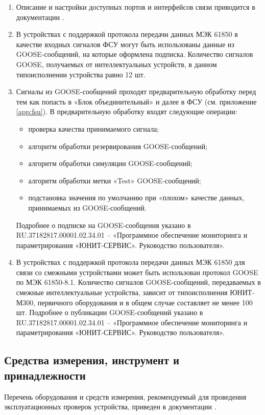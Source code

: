 \begin{enumerate}[label=\arabic{section}.\arabic{subsection}.\arabic*, labelsep=4pt, leftmargin=0pt, itemindent=57pt]

\item
\sloppy Описание и настройки доступных портов и интерфейсов связи приводится в документации \ManualUnitGeneral.

\item
В устройствах с поддержкой протокола передачи данных МЭК 61850 в качестве входных сигналов ФСУ могут быть использованы данные из GOOSE-сообщений, на которые оформлена подписка.
Количество сигналов GOOSE, получаемых от интеллектуальных устройств, в данном типоисполнении устройства равно 12 шт.

\item
Сигналы из GOOSE-сообщений проходят предварительную обработку перед тем как попасть в «Блок объединительный» и далее в ФСУ (см. приложение \ref{app:fsu}).
В предварительную обработку входят следующие операции:
\begin{itemize}
\item проверка качества принимаемого сигнала;
\item алгоритм обработки резервирования GOOSE-сообщений;
\item алгоритм обработки симуляции GOOSE-сообщений;
\item алгоритм обработки метки «Test» GOOSE-сообщений;
\item подстановка значения по умолчанию при «плохом» качестве данных, принимаемых из GOOSE-сообщений.
\end{itemize}
Подробнее о подписке на GOOSE-сообщения указано в RU.37182817.00001.02.34.01 – «Программное обеспечение мониторинга и параметрирования «ЮНИТ-СЕРВИС». Руководство пользователя».

\item 
В устройствах с поддержкой протокола передачи данных МЭК 61850 для связи со смежными устройствами может быть использован протокол GOOSE по МЭК 61850-8.1.
Количество сигналов GOOSE-сообщений, передаваемых в смежные интеллектуальные устройства, зависит от типоисполнения ЮНИТ-М300, первичного оборудования и в общем случае составляет не менее 100 шт.
Подробнее о публикации GOOSE-сообщений указано в RU.37182817.00001.02.34.01 – «Программное обеспечение мониторинга и параметрирования «ЮНИТ-СЕРВИС». Руководство пользователя».

\end{enumerate}

\color{unidarkgreen}\subsection{Средства измерения, инструмент и принадлежности}\color{black}
Перечень оборудования и средств измерения, рекомендуемый для проведения эксплуатационных проверок устройства, приведен в документации \ManualUnitGeneral.

